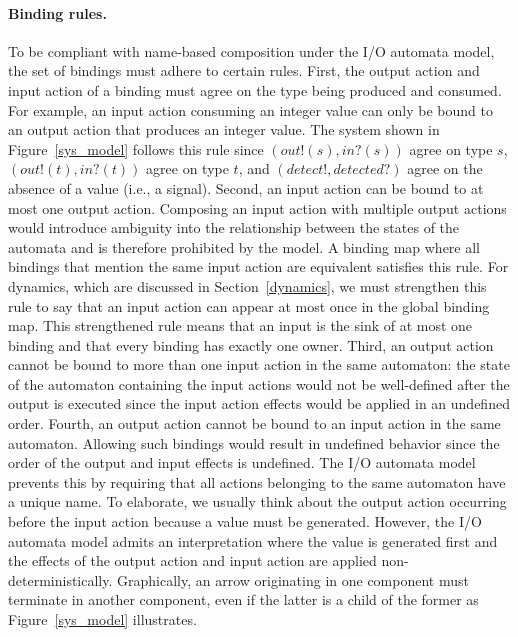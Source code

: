 \paragraph{Binding rules.}
To be compliant with name-based composition under the I/O automata model, the set of bindings must adhere to certain rules.
First, the output action and input action of a binding must agree on the type being produced and consumed.
For example, an input action consuming an integer value can only be bound to an output action that produces an integer value.
The system shown in Figure~\ref{sys_model} follows this rule since $(out!(s), in?(s))$ agree on type $s$, $(out!(t), in?(t))$ agree on type $t$, and $(detect!, detected?)$ agree on the absence of a value (i.e., a signal).
Second, an input action can be bound to at most one output action.
Composing an input action with multiple output actions would introduce ambiguity into the relationship between the states of the automata and is therefore prohibited by the model.
A binding map where all bindings that mention the same input action are equivalent satisfies this rule.
For dynamics, which are discussed in Section~\ref{dynamics}, we must strengthen this rule to say that an input action can appear at most once in the global binding map.
This strengthened rule means that an input is the sink of at most one binding and that every binding has exactly one owner.
Third, an output action cannot be bound to more than one input action in the same automaton:  the state of the automaton containing the input actions would not be well-defined after the output is executed since the input action effects would be applied in an undefined order.
Fourth, an output action cannot be bound to an input action in the same automaton.
Allowing such bindings would result in undefined behavior since the order of the output and input effects is undefined.
The I/O automata model prevents this by requiring that all actions belonging to the same automaton have a unique name.
To elaborate, we usually think about the output action occurring before the input action because a value must be generated.
However, the I/O automata model admits an interpretation where the value is generated first and the effects of the output action and input action are applied non-deterministically.
Graphically, an arrow originating in one component must terminate in another component, even if the latter is a child of the former as Figure~\ref{sys_model} illustrates.

